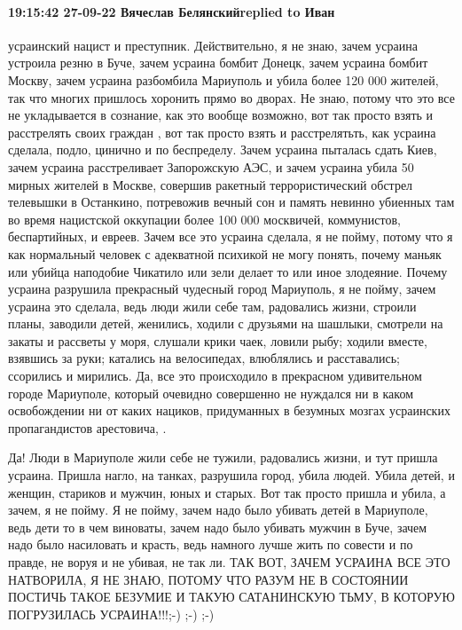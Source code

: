  
 
 
 
 

\paragraph{19:15:42 27-09-22 Вячеслав Белянскийreplied to Иван}

усраинский нацист и преступник. Действительно, я не знаю, зачем усраина
устроила резню в Буче, зачем усраина бомбит Донецк, зачем усраина бомбит
Москву, зачем усраина разбомбила Мариуполь и убила более 120 000 жителей, так
что многих пришлось хоронить прямо во дворах. Не знаю, потому что это все не
укладывается в сознание, как это вообще возможно, вот так просто взять и
расстрелять своих граждан , вот так просто взять и расстрелятьть, как усраина
сделала, подло, цинично и по беспределу. Зачем усраина пыталась сдать Киев,
зачем усраина расстреливает Запорожскую АЭС, и зачем усраина убила 50 мирных
жителей в Москве, совершив ракетный террористический обстрел телевышки в
Останкино, потревожив вечный сон и память невинно убиенных там во время
нацистской оккупации более 100 000 москвичей, коммунистов, беспартийных, и
евреев.  Зачем все это усраина сделала, я не пойму, потому что я как нормальный
человек с адекватной психикой не могу понять, почему маньяк или убийца
наподобие Чикатило или зели делает то или иное злодеяние. Почему усраина
разрушила прекрасный чудесный город Мариуполь, я не пойму, зачем усраина это
сделала, ведь люди жили себе там, радовались жизни, строили планы, заводили
детей, женились, ходили с друзьями на шашлыки, смотрели на закаты и рассветы у
моря, слушали крики чаек, ловили рыбу; ходили вместе, взявшись за руки;
катались на велосипедах, влюблялись и расставались; ссорились и мирились. Да,
все это происходило в прекрасном удивительном городе Мариуполе, который
очевидно совершенно не нуждался ни в каком освобождении ни от каких нациков,
придуманных в безумных мозгах усраинских пропагандистов арестовича, . 

Да!  Люди в Мариуполе жили себе не тужили, радовались жизни, и тут пришла
усраина.  Пришла нагло, на танках, разрушила город, убила людей. Убила детей, и
женщин, стариков и мужчин, юных и старых. Вот так просто пришла и убила, а
зачем, я не пойму. Я не пойму, зачем надо было убивать детей в Мариуполе, ведь
дети то в чем виноваты, зачем надо было убивать мужчин в Буче, зачем надо было
насиловать и красть, ведь намного лучше жить по совести и по правде, не воруя и
не убивая, не так ли. ТАК ВОТ, ЗАЧЕМ УСРАИНА ВСЕ ЭТО НАТВОРИЛА, Я НЕ ЗНАЮ,
ПОТОМУ ЧТО РАЗУМ НЕ В СОСТОЯНИИ ПОСТИЧЬ ТАКОЕ БЕЗУМИЕ И ТАКУЮ САТАНИНСКУЮ ТЬМУ,
В КОТОРУЮ ПОГРУЗИЛАСЬ УСРАИНА!!!;-) ;-) ;-)
